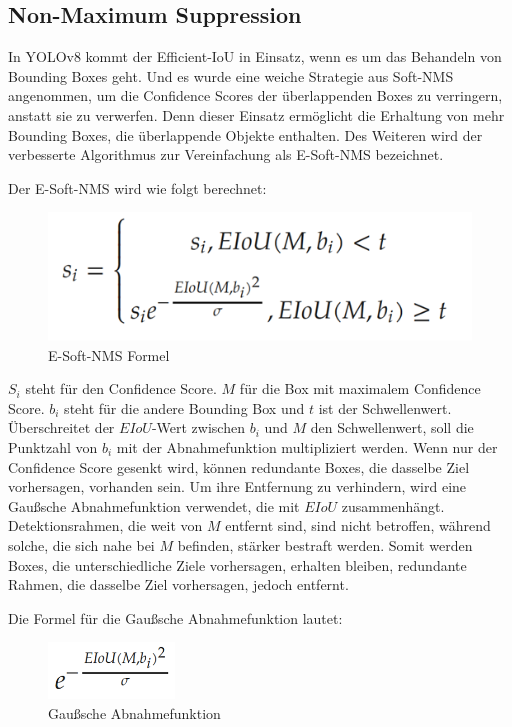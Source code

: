 \documentclass[a4paper,12pt]{article}
\begin{document}
\subsection{Non-Maximum Suppression}

\noindent In YOLOv8 kommt der Efficient-IoU in Einsatz, wenn es um das Behandeln von Bounding Boxes geht. Und es wurde eine weiche Strategie aus Soft-NMS angenommen, um die Confidence Scores der überlappenden Boxes zu verringern, anstatt sie zu verwerfen. Denn dieser Einsatz ermöglicht die Erhaltung von mehr Bounding Boxes, die überlappende Objekte enthalten. Des Weiteren wird der verbesserte Algorithmus zur Vereinfachung als E-Soft-NMS bezeichnet.

\noindent Der E-Soft-NMS wird wie folgt berechnet:

\begin{figure}[h]
    \centering
    \includegraphics[width=\textwidth, height=\textheight, keepaspectratio]{Bild1.png}
    \caption{E-Soft-NMS Formel}
    \label{fig:bild1}
\end{figure}

\noindent $S_i$ steht für den Confidence Score. $M$ für die Box mit maximalem Confidence Score. $b_i$ steht für die andere Bounding Box und $t$ ist der Schwellenwert. Überschreitet der $EIoU$-Wert zwischen $b_i$ und $M$ den Schwellenwert, soll die Punktzahl von $b_i$ mit der Abnahmefunktion multipliziert werden. Wenn nur der Confidence Score gesenkt wird, können redundante Boxes, die dasselbe Ziel vorhersagen, vorhanden sein. Um ihre Entfernung zu verhindern, wird eine Gaußsche Abnahmefunktion verwendet, die mit $EIoU$ zusammenhängt. Detektionsrahmen, die weit von $M$ entfernt sind, sind nicht betroffen, während solche, die sich nahe bei $M$ befinden, stärker bestraft werden. Somit werden Boxes, die unterschiedliche Ziele vorhersagen, erhalten bleiben, redundante Rahmen, die dasselbe Ziel vorhersagen, jedoch entfernt.

\noindent Die Formel für die Gaußsche Abnahmefunktion lautet:

\begin{figure}[h]
    \centering
    \includegraphics[width=0.3\textwidth, height=\textheight, keepaspectratio]{Bild2.png}
    \caption{Gaußsche Abnahmefunktion}
    \label{fig:bild2}
\end{figure}
\end{document}
